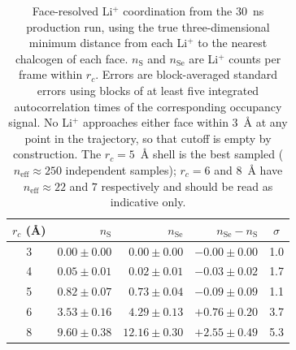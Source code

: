 \begin{table}[htbp]
\caption{Face-resolved Li$^+$ coordination from the 30~ns production run,
using the true three-dimensional minimum distance from each Li$^+$ to the
nearest chalcogen of each face. $n_{\mathrm{S}}$ and $n_{\mathrm{Se}}$ are
Li$^+$ counts per frame within $r_c$. Errors are block-averaged standard
errors using blocks of at least five integrated autocorrelation times of
the corresponding occupancy signal. No Li$^+$ approaches either face
within 3~\AA{} at any point in the trajectory, so that cutoff is empty by
construction. The $r_c = 5$~\AA{} shell is the best sampled
($n_{\mathrm{eff}} \approx 250$ independent samples); $r_c = 6$ and
8~\AA{} have $n_{\mathrm{eff}} \approx 22$ and $7$ respectively and
should be read as indicative only.}
\label{tab:contacts}
\centering
\begin{tabular}{crrrc}
\hline
$r_c$ (\AA) & $n_{\mathrm{S}}$ & $n_{\mathrm{Se}}$ & $n_{\mathrm{Se}}-n_{\mathrm{S}}$ & $\sigma$ \\
\hline
3 & $0.00 \pm 0.00$ & $0.00 \pm 0.00$ & $-0.00 \pm 0.00$ & 1.0 \\
4 & $0.05 \pm 0.01$ & $0.02 \pm 0.01$ & $-0.03 \pm 0.02$ & 1.7 \\
5 & $0.82 \pm 0.07$ & $0.73 \pm 0.04$ & $-0.09 \pm 0.09$ & 1.1 \\
6 & $3.53 \pm 0.16$ & $4.29 \pm 0.13$ & $+0.76 \pm 0.20$ & 3.7 \\
8 & $9.60 \pm 0.38$ & $12.16 \pm 0.30$ & $+2.55 \pm 0.49$ & 5.3 \\
\hline
\end{tabular}
\end{table}

